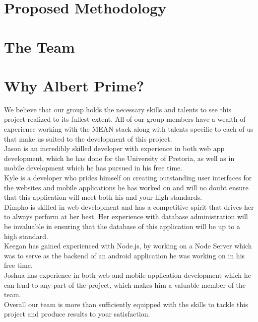 \documentclass[12pt]{article}
\begin{document}
	\newpage
	\section{Proposed Methodology}
	
	\newpage
	\section{The Team}
	

	\newpage
	\section{Why Albert Prime?}
	We believe that our group holds the necessary skills and talents to see this project realized to its fullest extent. All of our group members have a wealth of experience working with the MEAN stack along with talents specific to each of us that make us suited to the development of this project.\\
	
	Jason is an incredibly skilled developer with experience in both web app development, which he has done for the University of Pretoria, as well as in mobile development which he has pursued in his free time.\\
	
	Kyle is a developer who prides himself on creating outstanding user interfaces for the websites and mobile applications he has worked on and will no doubt ensure that this application will meet both his and your high standards.\\
	
	Dimpho is skilled in web development and has a competitive spirit that drives her to always perform at her best. Her experience with database administration will be invaluable in ensuring that the database of this application will be up to a high standard.\\
	
	Keegan has gained experienced with Node.js, by working on a Node Server which was to serve as the backend of an android application he was working on in his free time.\\
	
	Joshua has experience in both web and mobile application development which he can lend to any part of the project, which makes him a valuable member of the team.\\
	
	Overall our team is more than sufficiently equipped with the skills to tackle this project and produce results to your satisfaction.\\
	
\end{document}
